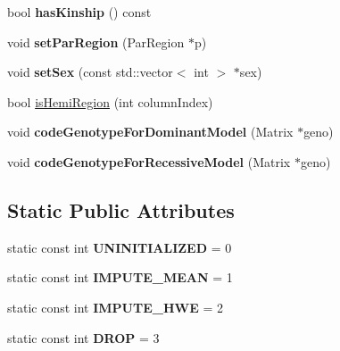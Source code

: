 \begin{DoxyCompactItemize}
\item 
\hypertarget{classDataConsolidator_a55c87299fae9e49cf7e56837cd9115a9}{bool {\bfseries has\-Kinship} () const }\label{classDataConsolidator_a55c87299fae9e49cf7e56837cd9115a9}

\item 
\hypertarget{classDataConsolidator_a70cead67b8c1b36c33f09abb7ecfdd4d}{void {\bfseries set\-Par\-Region} (Par\-Region $\ast$p)}\label{classDataConsolidator_a70cead67b8c1b36c33f09abb7ecfdd4d}

\item 
\hypertarget{classDataConsolidator_aa20113afd520eb2602bf474858a0e406}{void {\bfseries set\-Sex} (const std\-::vector$<$ int $>$ $\ast$sex)}\label{classDataConsolidator_aa20113afd520eb2602bf474858a0e406}

\item 
bool \hyperlink{classDataConsolidator_aff9b9fa8b9adaf51da4957585bd8d58b}{is\-Hemi\-Region} (int column\-Index)
\item 
\hypertarget{classDataConsolidator_ae1c486ce4cd359714d5b26103d30de41}{void {\bfseries code\-Genotype\-For\-Dominant\-Model} (Matrix $\ast$geno)}\label{classDataConsolidator_ae1c486ce4cd359714d5b26103d30de41}

\item 
\hypertarget{classDataConsolidator_ab2146a967d511a61c4eaec48630c0d82}{void {\bfseries code\-Genotype\-For\-Recessive\-Model} (Matrix $\ast$geno)}\label{classDataConsolidator_ab2146a967d511a61c4eaec48630c0d82}

\end{DoxyCompactItemize}
\subsection*{Static Public Attributes}
\begin{DoxyCompactItemize}
\item 
\hypertarget{classDataConsolidator_a1a79503768c029b2d3082cf018cf4c50}{static const int {\bfseries U\-N\-I\-N\-I\-T\-I\-A\-L\-I\-Z\-E\-D} = 0}\label{classDataConsolidator_a1a79503768c029b2d3082cf018cf4c50}

\item 
\hypertarget{classDataConsolidator_a96f6214f9c99bc1ce51325a654a50337}{static const int {\bfseries I\-M\-P\-U\-T\-E\-\_\-\-M\-E\-A\-N} = 1}\label{classDataConsolidator_a96f6214f9c99bc1ce51325a654a50337}

\item 
\hypertarget{classDataConsolidator_a243483b1928920c0d485add4250c29db}{static const int {\bfseries I\-M\-P\-U\-T\-E\-\_\-\-H\-W\-E} = 2}\label{classDataConsolidator_a243483b1928920c0d485add4250c29db}

\item 
\hypertarget{classDataConsolidator_aa80afbd032e7318b6adf6e91dc37b684}{static const int {\bfseries D\-R\-O\-P} = 3}\label{classDataConsolidator_aa80afbd032e7318b6adf6e91dc37b684}

\end{DoxyCompactItemize}


